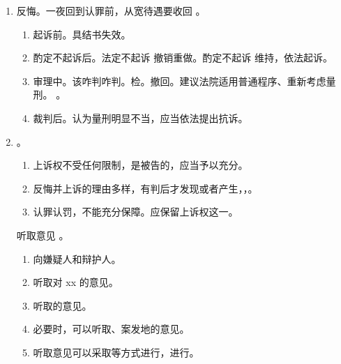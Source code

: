 \begin{enumerate}
\begin{enumerate}
\begin{enumerate}
\begin{enumerate}
                          \item 普通程序简化审。。
                        \end{enumerate}
                  \item 二审认。\sjt 不用退回，但早优于晚。
                \end{enumerate}
          \item 反悔。一夜回到认罪前，从宽待遇要收回 \yjt {}。
                \begin{enumerate}
                  \item 起诉前。具结书失效。
                  \item 酌定不起诉后。法定不起诉 \yjt 撤销重做。酌定不起诉 \yjt 维持，依法起诉。
                  \item 审理中。该咋判咋判。检。\yi 撤回。\er 建议法院适用普通程序、重新考虑量刑。
                        。
                  \item 裁判后。认为量刑明显不当，应当依法提出抗诉。
                \end{enumerate}
          \item {}。
                \begin{enumerate}
                  \item 上诉权不受任何限制，是被告的，应当予以充分。
                  \item 反悔并上诉的理由多样，有判后才发现或者产生，，。
                  \item 认罪认罚，不能充分保障。应保留上诉权这一。
                \end{enumerate}
                \begin{kk}{听取意见}
                  。
                  \begin{enumerate}
                    \item 向嫌疑人和辩护人。
                    \item 听取对 xx 的意见。
                    \item 听取的意见。
                    \item 必要时，可以听取、案发地的意见。
                    \item 听取意见可以采取等方式进行，进行。

\end{enumerate}
\end{kk}
\end{enumerate}
\end{enumerate}
